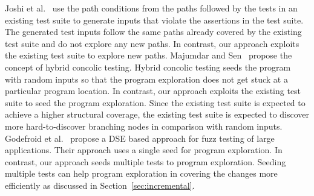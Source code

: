 Joshi et al.~\cite{joshi:pretext} use the path conditions from the paths followed by the tests in an existing test suite to generate inputs that violate the assertions in the test suite. The generated test inputs follow the same paths already covered by the existing test suite and do not explore any new paths. In contrast, our approach exploits the existing test suite to explore new paths. Majumdar and Sen~\cite{majumdar:hybrid} propose the concept of hybrid concolic testing. Hybrid concolic testing seeds the program with random inputs so that the program exploration does not get stuck at a particular program location. In contrast, our approach exploits the existing test suite to seed the program exploration. Since the existing test suite is expected to achieve a higher structural coverage, the existing test suite is expected to discover more hard-to-discover branching nodes in comparison with random inputs. Godefroid et al.~\cite{godefroid:fuzz} propose a DSE based approach for fuzz testing of large applications. Their approach uses a single seed for program exploration. In contrast, our approach  seeds multiple tests to program exploration. Seeding multiple tests can help program exploration in covering the changes more efficiently as discussed in Section~\ref{sec:incremental}. 